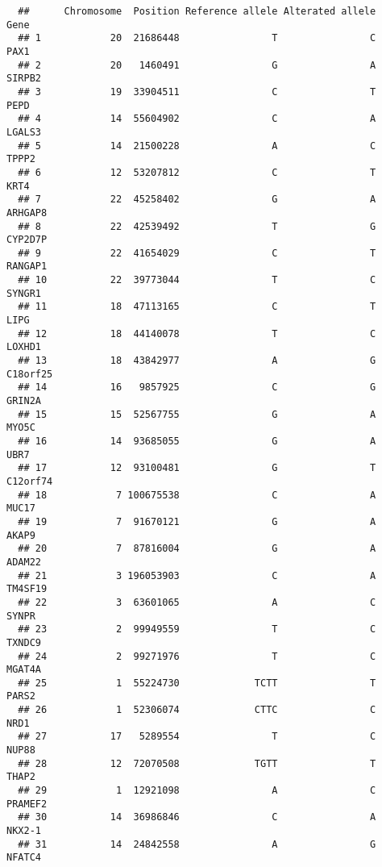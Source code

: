 \documentclass[12pt,twoside]{reedthesis}
\theoremstyle{definition}
\theoremstyle{definition}
\theoremstyle{remark}
\begin{document}
  \begin{verbatim}
  ##      Chromosome  Position Reference allele Alterated allele           Gene
  ## 1            20  21686448                T                C           PAX1
  ## 2            20   1460491                G                A         SIRPB2
  ## 3            19  33904511                C                T           PEPD
  ## 4            14  55604902                C                A         LGALS3
  ## 5            14  21500228                A                C          TPPP2
  ## 6            12  53207812                C                T           KRT4
  ## 7            22  45258402                G                A        ARHGAP8
  ## 8            22  42539492                T                G        CYP2D7P
  ## 9            22  41654029                C                T        RANGAP1
  ## 10           22  39773044                T                C         SYNGR1
  ## 11           18  47113165                C                T           LIPG
  ## 12           18  44140078                T                C         LOXHD1
  ## 13           18  43842977                A                G       C18orf25
  ## 14           16   9857925                C                G         GRIN2A
  ## 15           15  52567755                G                A          MYO5C
  ## 16           14  93685055                G                A           UBR7
  ## 17           12  93100481                G                T       C12orf74
  ## 18            7 100675538                C                A          MUC17
  ## 19            7  91670121                G                A          AKAP9
  ## 20            7  87816004                G                A         ADAM22
  ## 21            3 196053903                C                A        TM4SF19
  ## 22            3  63601065                A                C          SYNPR
  ## 23            2  99949559                T                C         TXNDC9
  ## 24            2  99271976                T                C         MGAT4A
  ## 25            1  55224730             TCTT                T          PARS2
  ## 26            1  52306074             CTTC                C           NRD1
  ## 27           17   5289554                T                C          NUP88
  ## 28           12  72070508             TGTT                T          THAP2
  ## 29            1  12921098                A                C        PRAMEF2
  ## 30           14  36986846                C                A         NKX2-1
  ## 31           14  24842558                A                G         NFATC4

\end{verbatim}
\end{document}
